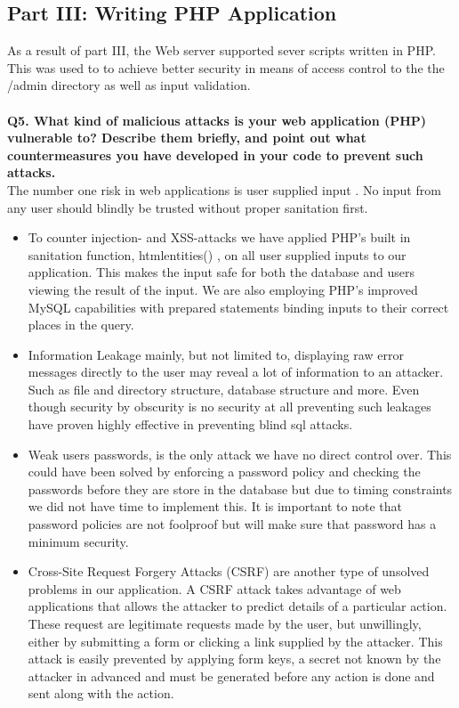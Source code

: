 \documentclass[a4paper, 12pt]{article}
\begin{document}
\subsection{Part III: Writing PHP Application}
As a result of part III, the Web server supported sever scripts written in PHP. This was used to to achieve better security in means of access control to the the /admin directory as well as input validation. \\
\\
{\bf Q5. What kind of malicious attacks is your web application (PHP) vulnerable to? Describe
them briefly, and point out what countermeasures you have developed in your code to prevent
such attacks.}
\\
The number one risk in web applications is user supplied input \cite{ti}. No input from any user should blindly be trusted without proper sanitation first.
\begin{itemize}
\item To counter injection- and XSS-attacks we have applied PHP’s built in sanitation function, htmlentities() \cite{syv}, on all user supplied inputs to our application. This makes the input safe for both the database and users viewing the result of the input. We are also employing PHP’s improved MySQL capabilities with prepared statements binding inputs to their correct places in the query.
\item Information Leakage mainly, but not limited to, displaying raw error messages directly to the user may reveal a lot of information to an attacker. Such as file and directory structure, database structure and more. Even though security by obscurity is no security at all preventing such leakages have proven highly effective in preventing blind sql attacks. 
\item Weak users passwords, is the only attack we have no direct control over. This could have been solved by enforcing a password policy and checking the passwords before they are store in the database but due to timing constraints we did not have time to implement this. It is important to note that password policies are not foolproof but will make sure that password has a minimum security.
\item Cross-Site Request Forgery Attacks (CSRF) are another type of unsolved problems in our application. A CSRF attack takes advantage of web applications that allows the attacker to predict details of a particular action. These request are legitimate requests made by the user, but unwillingly, either by submitting a form or clicking a link supplied by the attacker. This attack is easily prevented by applying form keys, a secret not known by the attacker in advanced and must be generated before any action is done and sent along with the action.
\end{itemize}
\end{document}
